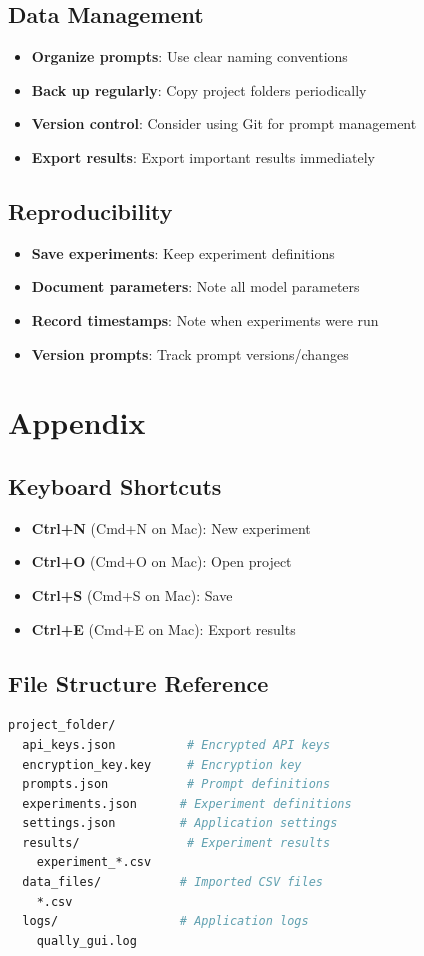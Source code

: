 \documentclass[11pt,a4paper]{article}
\begin{document}
\subsection{Data Management}
\begin{itemize}
    \item \textbf{Organize prompts}: Use clear naming conventions
    \item \textbf{Back up regularly}: Copy project folders periodically
    \item \textbf{Version control}: Consider using Git for prompt management
    \item \textbf{Export results}: Export important results immediately
\end{itemize}

\subsection{Reproducibility}
\begin{itemize}
    \item \textbf{Save experiments}: Keep experiment definitions
    \item \textbf{Document parameters}: Note all model parameters
    \item \textbf{Record timestamps}: Note when experiments were run
    \item \textbf{Version prompts}: Track prompt versions/changes
\end{itemize}

\section{Appendix}
\label{sec:appendix}

\subsection{Keyboard Shortcuts}
\begin{itemize}
    \item \textbf{Ctrl+N} (Cmd+N on Mac): New experiment
    \item \textbf{Ctrl+O} (Cmd+O on Mac): Open project
    \item \textbf{Ctrl+S} (Cmd+S on Mac): Save
    \item \textbf{Ctrl+E} (Cmd+E on Mac): Export results
\end{itemize}

\subsection{File Structure Reference}
\begin{lstlisting}[language=bash, basicstyle=\ttfamily\small]
project_folder/
  api_keys.json          # Encrypted API keys
  encryption_key.key     # Encryption key
  prompts.json           # Prompt definitions
  experiments.json      # Experiment definitions
  settings.json         # Application settings
  results/               # Experiment results
    experiment_*.csv
  data_files/           # Imported CSV files
    *.csv
  logs/                 # Application logs
    qually_gui.log
\end{lstlisting}
\end{document}

